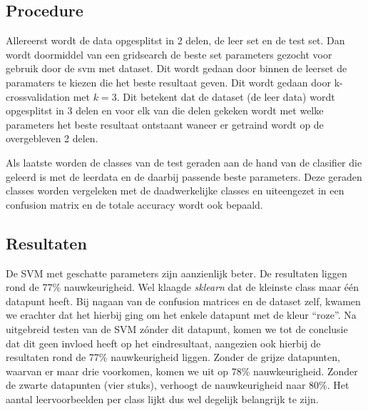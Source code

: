 \documentclass{article}
\begin{document}
\subsection{Procedure}
Allereerst wordt de data opgesplitst in 2 delen, de leer set en de test set.
Dan wordt doormiddel van een gridsearch de beste set parameters gezocht voor
gebruik door de svm met dataset. Dit wordt gedaan door binnen de leerset de
paramaters te kiezen die het beste resultaat geven. Dit wordt gedaan door
k-crossvalidation met $k=3$. Dit betekent dat de dataset (de leer data) wordt
opgesplitst in 3 delen en voor elk van die delen gekeken wordt met welke
parameters het beste resultaat ontstaant waneer er getraind wordt op de
overgebleven 2 delen.

Als laatste worden de classes van de test geraden aan de hand van de clasifier
die geleerd is met de leerdata en de daarbij passende beste parameters. Deze
geraden classes worden vergeleken met de daadwerkelijke classes en uiteengezet
in een confusion matrix en de totale accuracy wordt ook bepaald.


\subsection{Resultaten}
De SVM met geschatte parameters zijn aanzienlijk beter. De resultaten liggen
rond de 77\% nauwkeurigheid. Wel klaagde \textit{sklearn} dat de kleinste class
maar één datapunt heeft. Bij nagaan van de confusion matrices en de dataset
zelf, kwamen we erachter dat het hierbij ging om het enkele datapunt met de
kleur ``roze''. Na uitgebreid testen van de SVM zónder dit datapunt, komen we
tot de conclusie dat dit geen invloed heeft op het eindresultaat, aangezien ook
hierbij de resultaten rond de 77\% nauwkeurigheid liggen. Zonder de grijze
datapunten, waarvan er maar drie voorkomen, komen we uit op 78\% nauwkeurigheid.
Zonder de zwarte datapunten (vier stuks), verhoogt de nauwkeurigheid naar 80\%.
Het aantal leervoorbeelden per class lijkt dus wel degelijk belangrijk te zijn.
\end{document}
